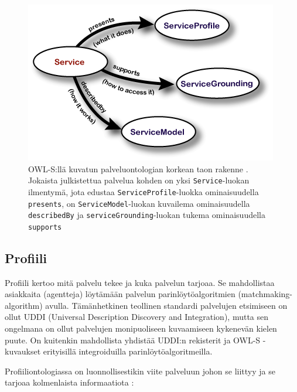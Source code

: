 \documentclass[finnish]{tktltiki2}
\theoremstyle{definition}
\theoremstyle{remark}
\begin{document}
 \begin{figure}[ht]
 \centering
 \includegraphics[scale=0.60]{karkea_taso.png}
 \caption{OWL-S:llä kuvatun palveluontologian korkean taon rakenne \cite{OWLS}. Jokaista julkistettua palvelua kohden on yksi \texttt{Service}-luokan ilmentymä, jota edustaa \texttt{ServiceProfile}-luokka ominaisuudella \texttt{presents}, on \texttt{ServiceModel}-luokan kuvailema ominaisuudella \texttt{describedBy} ja \texttt{serviceGrounding}-luokan tukema ominaisuudella \texttt{supports}}
 \label{karkea_taso}
\end{figure}
 


\subsection{Profiili}

Profiili kertoo mitä palvelu tekee ja kuka palvelun tarjoaa. Se mahdollistaa asiakkaita (agentteja) löytämään palvelun parinlöytöalgoritmien (matchmaking-algorithm) avulla. Tämänhetkinen teollinen standardi palvelujen etsimiseen on ollut UDDI (Universal Description Discovery and Integration), mutta sen ongelmana on ollut palvelujen monipuoliseen kuvaamiseen kykenevän kielen puute. On kuitenkin mahdollista yhdistää UDDI:n rekisterit ja OWL-S -kuvaukset erityisillä integroiduilla parinlöytöalgoritmeilla\cite{owls_approach}. 

Profiiliontologiassa on luonnollisestikin viite palveluun johon se liittyy ja se tarjoaa kolmenlaista informaatiota \cite{OWLS}:
\end{document}
